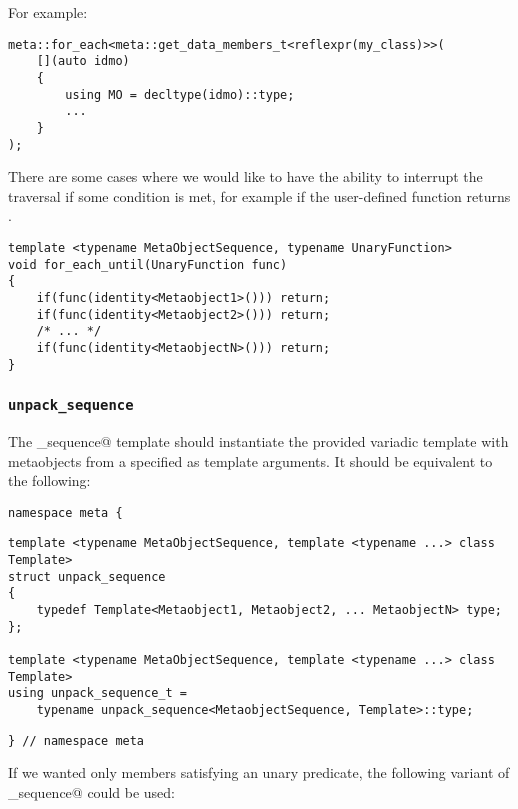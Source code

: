 For example:

\begin{verbatim}
meta::for_each<meta::get_data_members_t<reflexpr(my_class)>>(
	[](auto idmo)
	{
		using MO = decltype(idmo)::type;
		...
	}
);
\end{verbatim}

There are some cases where we would like to have the ability to interrupt
the traversal if some condition is met, for example if the user-defined
function returns \verb@true@.

\begin{verbatim}
template <typename MetaObjectSequence, typename UnaryFunction>
void for_each_until(UnaryFunction func)
{
	if(func(identity<Metaobject1>())) return;
	if(func(identity<Metaobject2>())) return;
	/* ... */
	if(func(identity<MetaobjectN>())) return;
}
\end{verbatim}

\subsubsection{\texttt{unpack\_sequence}}
\label{fac-unpack-sequence}

The \verb@unpack_sequence@ template should instantiate the provided variadic
template with metaobjects from a specified  as template
arguments. It should be equivalent to the following:

\begin{verbatim}
namespace meta {
\end{verbatim}
\begin{verbatim}
template <typename MetaObjectSequence, template <typename ...> class Template>
struct unpack_sequence
{
	typedef Template<Metaobject1, Metaobject2, ... MetaobjectN> type;
};

template <typename MetaObjectSequence, template <typename ...> class Template>
using unpack_sequence_t =
	typename unpack_sequence<MetaobjectSequence, Template>::type;
\end{verbatim}
\begin{verbatim}
} // namespace meta
\end{verbatim}

If we wanted only members satisfying an unary predicate, the following
variant of \verb@unpack_sequence@ could be used:

